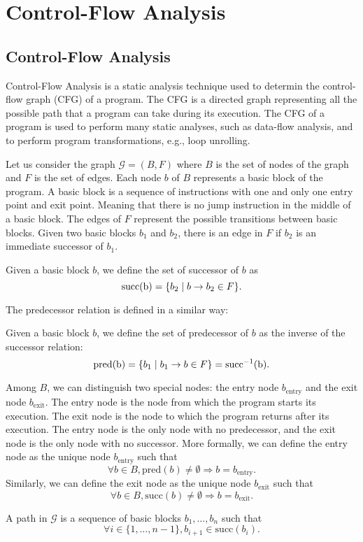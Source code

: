 \chapter{Control-Flow Analysis}
\section{Control-Flow Analysis}
\label{sec:controlflow}
Control-Flow Analysis is a static analysis technique used to determin the control-flow graph (CFG) of a program.
The CFG is a directed graph representing all the possible path that a program can
take during its execution. The CFG of a program is used to perform many static analyses, such as
data-flow analysis, and to perform program transformations, e.g., loop unrolling.


Let us consider the graph $\mathcal{G}=(B,F)$ where $B$ is the set of nodes 
of the graph and $F$ is the set of edges. Each node $b$ of $B$ represents a
basic block of the program. A basic block is a sequence of instructions with one and only one
entry point and exit point. Meaning that there is no jump instruction in the middle of a basic block.
The edges of $F$ represent the possible transitions between basic blocks. Given two
basic blocks $b_1$ and $b_2$, there is an edge  in $F$ if $b_2$ is an immediate
successor of $b_1$.
\begin{definition}
    Given a basic block $b$, we define the set of successor of $b$ as 
    $$ \text{succ(b)} = \{b_2 \mid  b \rightarrow b_2  \in F\}.$$
\end{definition}
The predecessor relation is defined in a similar way:
\begin{definition}
    Given a basic block $b$, we define the set of predecessor of $b$ as the 
    inverse of the successor relation:
    $$ \text{pred(b)} = \{b_1 \mid  b_1 \rightarrow b  \in F\} = \text{succ}^{-1}\text{(b)}.$$
\end{definition}
Among $B$, we can distinguish two special nodes: the entry node $b_{\text{entry}}$ and 
the exit node $b_{\text{exit}}$. The entry node is the node from which the program starts its execution.
The exit node is the node to which the program returns after its execution. The entry node is the only node
with no predecessor, and the exit node is the only node with no successor. More 
formally, we can define the entry node as the unique node $b_{\text{entry}}$ such that
$$ \forall b \in B, \text{pred}(b) \neq \emptyset \Rightarrow b = b_{\text{entry}}.$$
Similarly, we can define the exit node as the unique node $b_{\text{exit}}$ such that
$$ \forall b \in B, \text{succ}(b) \neq \emptyset \Rightarrow b = b_{\text{exit}}.$$
\begin{definition}
    A path in $\mathcal{G}$ is a sequence of basic blocks $b_1, \ldots, b_n$ such that
    $$ \forall i \in \{1, \ldots, n-1\},  b_{i+1} \in \text{succ}(b_i).$$
\end{definition}


